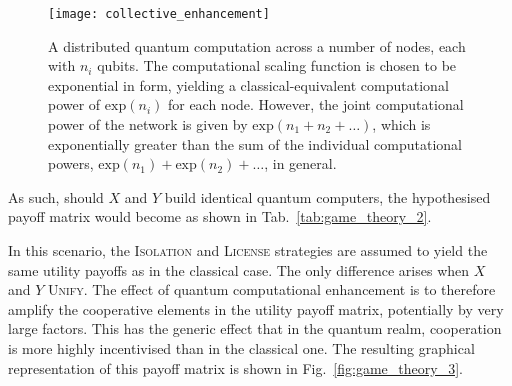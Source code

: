 \begin{figure}[!htbp]
\texttt{[image: collective\_enhancement]}
\captionspacefig \caption{A distributed quantum computation across a number of nodes, each with $n_i$ qubits. The computational scaling function is chosen to be exponential in form,  yielding a classical-equivalent computational power of \mbox{$\mathrm{exp}(n_i)$} for each node. However, the joint computational power of the network is given by \mbox{$\mathrm{exp}(n_1+n_2+\dots)$}, which is exponentially greater than the sum of the individual computational powers, \mbox{$\mathrm{exp}(n_1)+\mathrm{exp}(n_2)+\dots$}, in general.}\label{fig:exp_coll_enh}
\end{figure}

As such, should $X$ and $Y$ build identical quantum computers, the hypothesised payoff matrix would become as shown in Tab.~\ref{tab:game_theory_2}.

\begin{table}[!htbp]
\captionspacetab \caption{Example utility payoff matrix for two players with quantum computing resources. Note the enhancement in the diagonal $X+Y$ matrix element, compared to the classical case.}\label{tab:game_theory_2}
\end{table}

In this scenario, the \textsc{Isolation} and \textsc{License} strategies are assumed to yield the same utility payoffs as in the classical case. The only difference arises when $X$ and $Y$ \textsc{Unify}. The effect of quantum computational enhancement is to therefore amplify the cooperative elements in the utility payoff matrix, potentially by very large factors. This has the generic effect that in the quantum realm, cooperation is more highly incentivised than in the classical one. The resulting graphical representation of this payoff matrix is shown in Fig.~\ref{fig:game_theory_3}.

